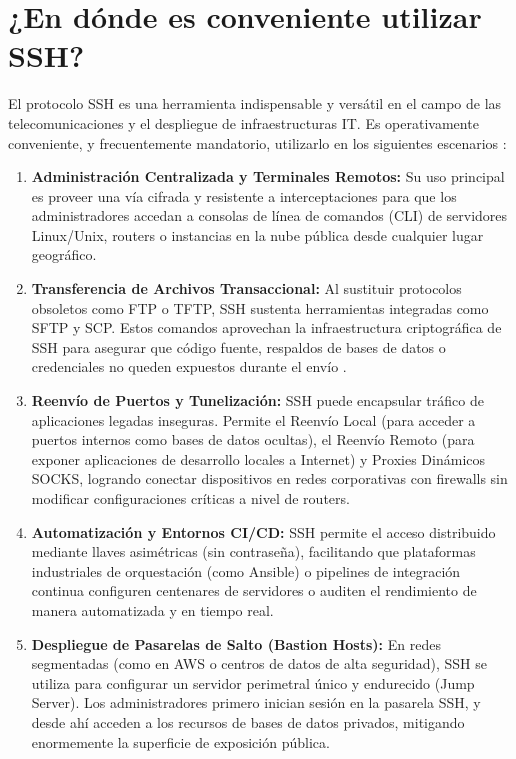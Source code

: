 \documentclass[a4paper,12pt]{article}
\begin{document}
\section{¿En dónde es conveniente utilizar SSH?}

El protocolo SSH es una herramienta indispensable y versátil en el campo de las telecomunicaciones y el despliegue de infraestructuras IT. Es operativamente conveniente, y frecuentemente mandatorio, utilizarlo en los siguientes escenarios \cite{stackscale_ssh}:

\begin{enumerate}
    \item \textbf{Administración Centralizada y Terminales Remotos:} Su uso principal es proveer una vía cifrada y resistente a interceptaciones para que los administradores accedan a consolas de línea de comandos (CLI) de servidores Linux/Unix, routers o instancias en la nube pública desde cualquier lugar geográfico.
    \item \textbf{Transferencia de Archivos Transaccional:} Al sustituir protocolos obsoletos como FTP o TFTP, SSH sustenta herramientas integradas como SFTP y SCP. Estos comandos aprovechan la infraestructura criptográfica de SSH para asegurar que código fuente, respaldos de bases de datos o credenciales no queden expuestos durante el envío \cite{stackscale_ssh}.
    \item \textbf{Reenvío de Puertos y Tunelización:} SSH puede encapsular tráfico de aplicaciones legadas inseguras. Permite el Reenvío Local (para acceder a puertos internos como bases de datos ocultas), el Reenvío Remoto (para exponer aplicaciones de desarrollo locales a Internet) y Proxies Dinámicos SOCKS, logrando conectar dispositivos en redes corporativas con firewalls sin modificar configuraciones críticas a nivel de routers.
    \item \textbf{Automatización y Entornos CI/CD:} SSH permite el acceso distribuido mediante llaves asimétricas (sin contraseña), facilitando que plataformas industriales de orquestación (como Ansible) o pipelines de integración continua configuren centenares de servidores o auditen el rendimiento de manera automatizada y en tiempo real.
    \item \textbf{Despliegue de Pasarelas de Salto (Bastion Hosts):} En redes segmentadas (como en AWS o centros de datos de alta seguridad), SSH se utiliza para configurar un servidor perimetral único y endurecido (Jump Server). Los administradores primero inician sesión en la pasarela SSH, y desde ahí acceden a los recursos de bases de datos privados, mitigando enormemente la superficie de exposición pública.
\end{enumerate}
\end{document}

